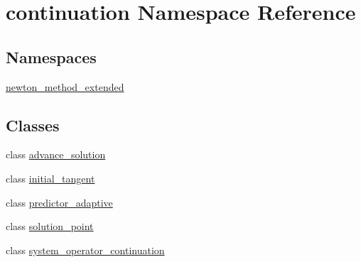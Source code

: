 \hypertarget{namespacecontinuation}{\section{continuation Namespace Reference}
\label{namespacecontinuation}
}
\subsection*{Namespaces}
\begin{DoxyCompactItemize}
\item 
\hyperlink{namespacecontinuation_1_1newton__method__extended}{newton\-\_\-method\-\_\-extended}
\end{DoxyCompactItemize}
\subsection*{Classes}
\begin{DoxyCompactItemize}
\item 
class \hyperlink{classcontinuation_1_1advance__solution}{advance\-\_\-solution}
\item 
class \hyperlink{classcontinuation_1_1initial__tangent}{initial\-\_\-tangent}
\item 
class \hyperlink{classcontinuation_1_1predictor__adaptive}{predictor\-\_\-adaptive}
\item 
class \hyperlink{classcontinuation_1_1solution__point}{solution\-\_\-point}
\item 
class \hyperlink{classcontinuation_1_1system__operator__continuation}{system\-\_\-operator\-\_\-continuation}
\end{DoxyCompactItemize}

